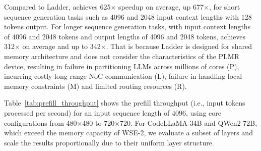 Compared to Ladder, \sys{} achieves 625$\times$ speedup on average, up 677$\times$, for short sequence generation tasks such as 4096 and 2048 input context lengths with 128 tokens output. For longer sequence generation tasks, with input context lengths of 4096 and 2048 tokens and output lengths of 4096 and 2048 tokens, \sys{} achieves 312$\times$ on average and up to 342$\times$. That is because Ladder is designed for shared memory architecture and does not consider the characteristics of the PLMR device, resulting in failure in partitioning LLMs across millions of cores (P), incurring costly long-range NoC communication (L), failure in handling local memory constraints (M) and limited routing resources (R).


\begin{table}[t]
  \centering
  \caption{Prefill throughput (tokens/s)}
  \vspace{-0.4cm}
\label{tab:prefill_throughput}
\end{table}%

 Table~\ref{tab:prefill_throughput} shows the prefill throughput (i.e., input tokens processed per second) for an input sequence length of 4096, using core configurations from 480$\times$480 to 720$\times$720. For CodeLLaMA-34B and QWen2-72B, which exceed the memory capacity of WSE-2, we evaluate a subset of layers and scale the results proportionally due to their uniform layer structure.

